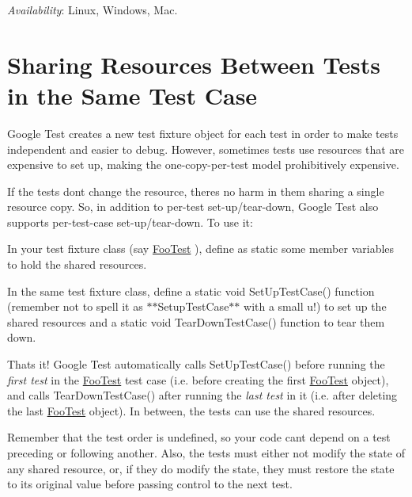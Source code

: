 {\itshape Availability}\+: Linux, Windows, Mac.

\section*{Sharing Resources Between Tests in the Same Test Case}

Google Test creates a new test fixture object for each test in order to make tests independent and easier to debug. However, sometimes tests use resources that are expensive to set up, making the one-\/copy-\/per-\/test model prohibitively expensive.

If the tests don\textquotesingle{}t change the resource, there\textquotesingle{}s no harm in them sharing a single resource copy. So, in addition to per-\/test set-\/up/tear-\/down, Google Test also supports per-\/test-\/case set-\/up/tear-\/down. To use it\+:


\begin{DoxyEnumerate}
\item In your test fixture class (say {\ttfamily \mbox{\hyperlink{class_foo_test}{Foo\+Test}}} ), define as {\ttfamily static} some member variables to hold the shared resources.
\end{DoxyEnumerate}
\begin{DoxyEnumerate}
\item In the same test fixture class, define a {\ttfamily static void Set\+Up\+Test\+Case()} function (remember not to spell it as $\ast$$\ast${\ttfamily Setup\+Test\+Case}$\ast$$\ast$ with a small {\ttfamily u}!) to set up the shared resources and a {\ttfamily static void Tear\+Down\+Test\+Case()} function to tear them down.
\end{DoxyEnumerate}

That\textquotesingle{}s it! Google Test automatically calls {\ttfamily Set\+Up\+Test\+Case()} before running the {\itshape first test} in the {\ttfamily \mbox{\hyperlink{class_foo_test}{Foo\+Test}}} test case (i.\+e. before creating the first {\ttfamily \mbox{\hyperlink{class_foo_test}{Foo\+Test}}} object), and calls {\ttfamily Tear\+Down\+Test\+Case()} after running the {\itshape last test} in it (i.\+e. after deleting the last {\ttfamily \mbox{\hyperlink{class_foo_test}{Foo\+Test}}} object). In between, the tests can use the shared resources.

Remember that the test order is undefined, so your code can\textquotesingle{}t depend on a test preceding or following another. Also, the tests must either not modify the state of any shared resource, or, if they do modify the state, they must restore the state to its original value before passing control to the next test.

